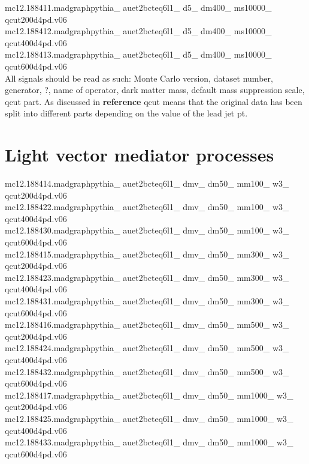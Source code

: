 mc12.188411.madgraphpythia\_  auet2bcteq6l1\_  d5\_  dm400\_  ms10000\_  qcut200d4pd.v06\\
mc12.188412.madgraphpythia\_  auet2bcteq6l1\_  d5\_  dm400\_  ms10000\_  qcut400d4pd.v06\\
mc12.188413.madgraphpythia\_  auet2bcteq6l1\_  d5\_  dm400\_  ms10000\_  qcut600d4pd.v06\\

All signals should be read as such: Monte Carlo version, dataset number, generator, ?, name of operator,  dark matter mass, default mass suppression scale, qcut part. As discussed in \textbf{reference} qcut means that the original data has been split into different parts depending on the value of the lead jet pt. 
\section{Light vector mediator processes}
mc12.188414.madgraphpythia\_ auet2bcteq6l1\_ dmv\_ dm50\_ mm100\_ w3\_ qcut200d4pd.v06\\ mc12.188422.madgraphpythia\_ auet2bcteq6l1\_ dmv\_ dm50\_ mm100\_ w3\_ qcut400d4pd.v06\\
mc12.188430.madgraphpythia\_ auet2bcteq6l1\_ dmv\_ dm50\_ mm100\_ w3\_ qcut600d4pd.v06\\
 
mc12.188415.madgraphpythia\_ auet2bcteq6l1\_ dmv\_ dm50\_ mm300\_ w3\_ qcut200d4pd.v06\\
mc12.188423.madgraphpythia\_ auet2bcteq6l1\_ dmv\_ dm50\_ mm300\_ w3\_ qcut400d4pd.v06\\
mc12.188431.madgraphpythia\_ auet2bcteq6l1\_ dmv\_ dm50\_ mm300\_ w3\_ qcut600d4pd.v06\\

mc12.188416.madgraphpythia\_ auet2bcteq6l1\_ dmv\_ dm50\_ mm500\_ w3\_ qcut200d4pd.v06\\
mc12.188424.madgraphpythia\_ auet2bcteq6l1\_ dmv\_ dm50\_ mm500\_ w3\_ qcut400d4pd.v06\\
mc12.188432.madgraphpythia\_ auet2bcteq6l1\_ dmv\_ dm50\_ mm500\_ w3\_ qcut600d4pd.v06\\

mc12.188417.madgraphpythia\_ auet2bcteq6l1\_ dmv\_ dm50\_ mm1000\_ w3\_ qcut200d4pd.v06\\
mc12.188425.madgraphpythia\_ auet2bcteq6l1\_ dmv\_ dm50\_ mm1000\_ w3\_ qcut400d4pd.v06\\
mc12.188433.madgraphpythia\_ auet2bcteq6l1\_ dmv\_ dm50\_ mm1000\_ w3\_ qcut600d4pd.v06\\

